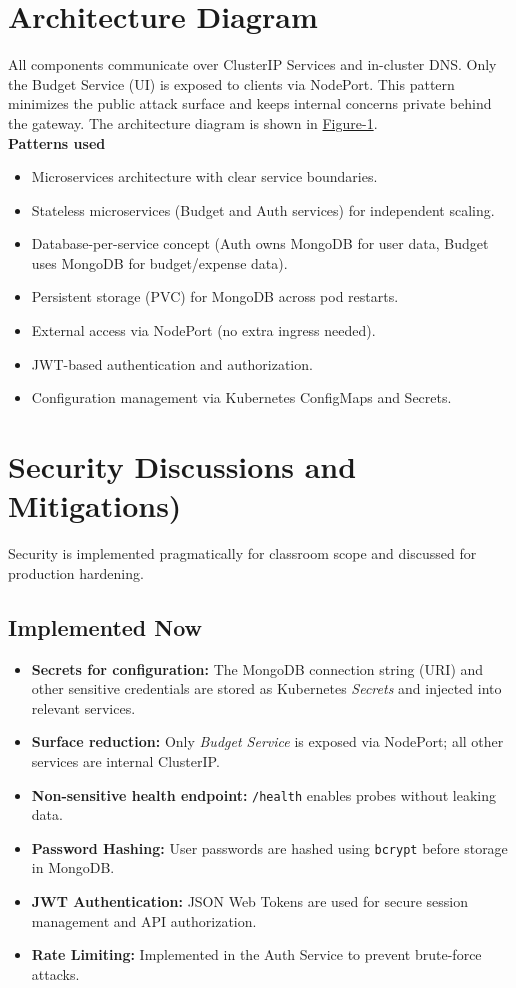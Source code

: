 \documentclass[conference]{IEEEtran}
\begin{document}
\section{\textbf{Architecture Diagram}}
All components communicate over ClusterIP Services and in-cluster DNS. Only the Budget Service (UI) is exposed to clients via NodePort. This pattern minimizes the public attack surface and keeps internal concerns private behind the gateway.
The architecture diagram is shown in \hyperref[fig:arch]{Figure-1}.\\
\textbf{Patterns used}
\begin{itemize}
  \item Microservices architecture with clear service boundaries.
  \item Stateless microservices (Budget and Auth services) for independent scaling.
  \item Database-per-service concept (Auth owns MongoDB for user data, Budget uses MongoDB for budget/expense data).
  \item Persistent storage (PVC) for MongoDB across pod restarts.
  \item External access via NodePort (no extra ingress needed).
  \item JWT-based authentication and authorization.
  \item Configuration management via Kubernetes ConfigMaps and Secrets.
\end{itemize}

\section{\textbf{Security Discussions and Mitigations)}}
Security is implemented pragmatically for classroom scope and discussed for production hardening.

\subsection{Implemented Now}
\begin{itemize}
  \item \textbf{Secrets for configuration:} The MongoDB connection string (URI) and other sensitive credentials are stored as Kubernetes \emph{Secrets} and injected into relevant services.
  \item \textbf{Surface reduction:} Only \emph{Budget Service} is exposed via NodePort; all other services are internal ClusterIP.
  \item \textbf{Non-sensitive health endpoint:} \texttt{/health} enables probes without leaking data.
  \item \textbf{Password Hashing:} User passwords are hashed using \texttt{bcrypt} before storage in MongoDB.
  \item \textbf{JWT Authentication:} JSON Web Tokens are used for secure session management and API authorization.
  \item \textbf{Rate Limiting:} Implemented in the Auth Service to prevent brute-force attacks.
\end{itemize}
\end{document}

